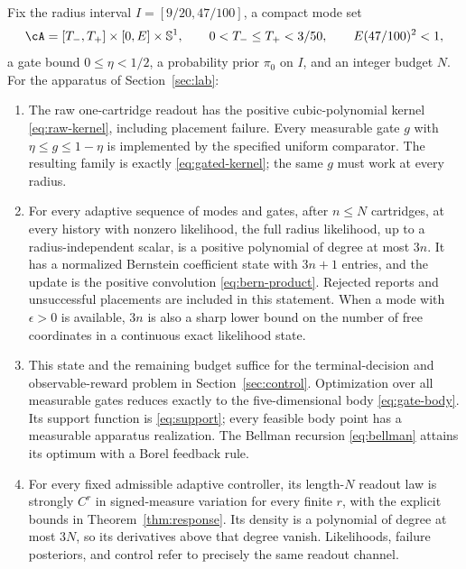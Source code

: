 \begin{theorem}\label{thm:main}
Fix the radius interval $I=[9/20,47/100]$, a compact mode set
\[
 \cA=[T_-,T_+]\times[0,E]\times\mathbb S^1,
 \qquad 0<T_-\le T_+<3/50,\qquad E(47/100)^2<1,
\]
a gate bound $0\le\eta<1/2$, a probability prior $\pi_0$ on $I$, and an
integer budget $N$. For the apparatus of Section~\ref{sec:lab}:
\begin{enumerate}
\item The raw one-cartridge readout has the positive cubic-polynomial
kernel \eqref{eq:raw-kernel}, including placement failure. Every measurable
gate $g$ with $\eta\le g\le1-\eta$ is implemented by the specified uniform
comparator. The resulting family is exactly \eqref{eq:gated-kernel}; the
same $g$ must work at every radius.
\item For every adaptive sequence of modes and gates, after $n\le N$
cartridges, at every history with nonzero likelihood, the full radius
likelihood, up to a radius-independent scalar,
is a positive polynomial of degree at most $3n$. It has a normalized
Bernstein coefficient state with $3n+1$ entries, and the update is the
positive convolution \eqref{eq:bern-product}. Rejected reports and
unsuccessful placements are included in this statement. When a mode with
$\epsilon>0$ is available, $3n$ is also a sharp lower bound on the number
of free coordinates in a continuous exact likelihood state.
\item This state and the remaining budget suffice for the terminal-decision
and observable-reward problem in Section~\ref{sec:control}. Optimization over
all measurable gates reduces exactly to the five-dimensional body
\eqref{eq:gate-body}. Its support function is \eqref{eq:support}; every
feasible body point has a measurable apparatus realization. The Bellman
recursion \eqref{eq:bellman} attains its optimum with a Borel feedback rule.
\item For every fixed admissible adaptive controller, its length-$N$
readout law is strongly $C^r$ in signed-measure variation for every finite
$r$, with the explicit bounds in Theorem~\ref{thm:response}. Its density is
a polynomial of degree at most $3N$, so its derivatives above that degree
vanish. Likelihoods, failure posteriors, and control refer to precisely the
same readout channel.
\end{enumerate}
\end{theorem}
